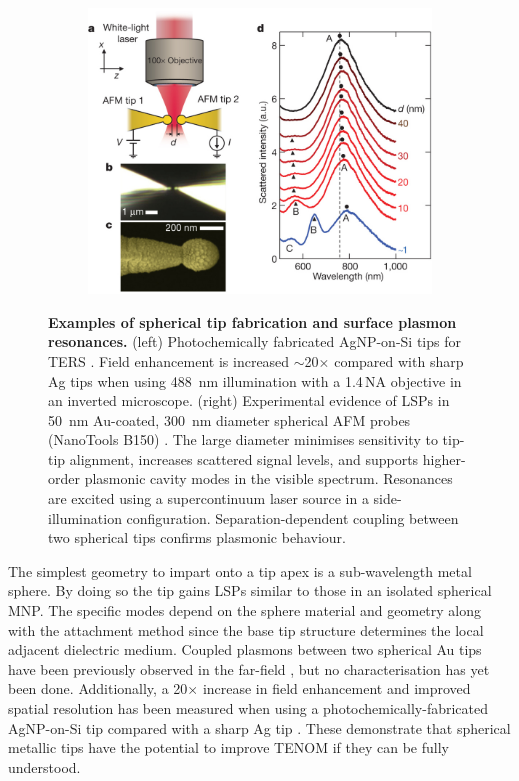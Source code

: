 \documentclass{article}
\begin{document}
\begin{figure}[bt]
\begin{subfigure}[t]{0.35\textwidth}
\end{subfigure}
~
\begin{subfigure}[t]{0.6\textwidth}
	\includegraphics[width=\textwidth, clip=true, trim=0 0 0 40]{figures/literature/nature11653-f1-2}
\end{subfigure}
\caption[Examples of spherical tip fabrication and surface plasmon resonances]{\textbf{Examples of spherical tip fabrication and surface plasmon resonances.} (left) Photochemically fabricated AgNP-on-Si tips for TERS \cite{umakoshi2012}. Field enhancement is increased $\sim$20$\times$ compared with sharp Ag tips when using \SI{488}{nm} illumination with a 1.4\,NA objective in an inverted microscope. (right) Experimental evidence of LSPs in \SI{50}{nm} Au-coated, \SI{300}{nm} diameter spherical AFM probes (NanoTools B150) \cite{savage2012}. The large diameter minimises sensitivity to tip-tip alignment, increases scattered signal levels, and supports higher-order plasmonic cavity modes in the visible spectrum. Resonances are excited using a supercontinuum laser source in a side-illumination configuration. Separation-dependent coupling between two spherical tips confirms plasmonic behaviour.}
\label{fig:savage2012a}
\end{figure}

The simplest geometry to impart onto a tip apex is a sub-wavelength metal sphere. By doing so the tip gains LSPs similar to those in an isolated spherical MNP. The specific modes depend on the sphere material and geometry along with the attachment method since the base tip structure determines the local adjacent dielectric medium. Coupled plasmons between two spherical Au tips have been previously observed in the far-field \cite{savage2012}, but no characterisation has yet been done. Additionally, a 20$\times$ increase in field enhancement and improved spatial resolution has been measured when using a photochemically-fabricated AgNP-on-Si tip compared with a sharp Ag tip \cite{umakoshi2012}. These demonstrate that spherical metallic tips have the potential to improve TENOM if they can be fully understood.
\end{document}
